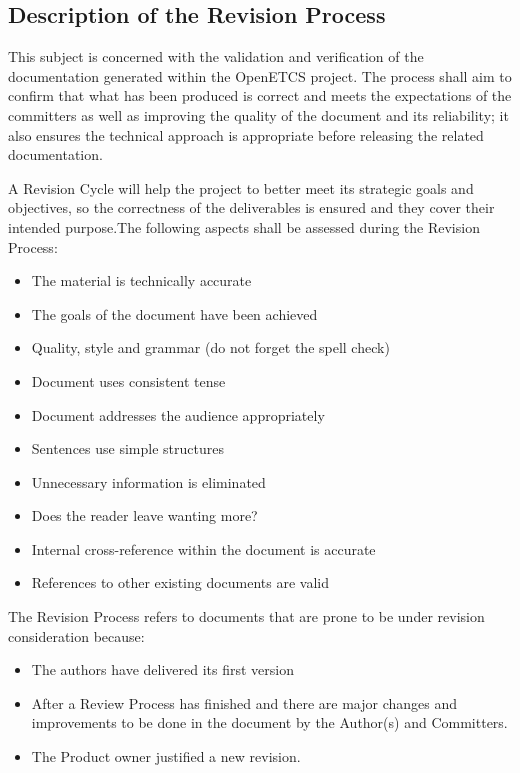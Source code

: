 \documentclass{template/openetcs_article}
\begin{document}
\subsection{Description of the Revision Process}

This subject is concerned with the validation and verification of the documentation generated within the OpenETCS project. The process shall aim to confirm that what has been produced is correct and meets the expectations of the committers as well as improving the quality of the document and its reliability; it also ensures the technical approach is appropriate before releasing the related documentation.

A Revision Cycle will help the project to better meet its strategic goals and objectives, so the correctness of the deliverables is ensured and they cover their intended purpose.The following aspects shall be assessed during the Revision Process:

\begin{itemize}
\item The material is technically accurate
\item The goals of the document have been achieved
\item Quality, style and grammar (do not forget the spell check)
\item Document uses consistent tense
\item Document addresses the audience appropriately
\item Sentences use simple structures
\item Unnecessary information is eliminated
\item Does the reader leave wanting more?
\item Internal cross-reference within the document is accurate
\item References to other existing documents are valid
\end{itemize}

The Revision Process refers to documents that are prone to be under revision consideration because:

\begin{itemize}
\item The authors have delivered its first version
\item After a Review Process has finished and there are major changes and improvements to be done in the document by the Author(s) and Committers. 
\item The Product owner justified a new revision. 
\end{itemize}
\end{document}

